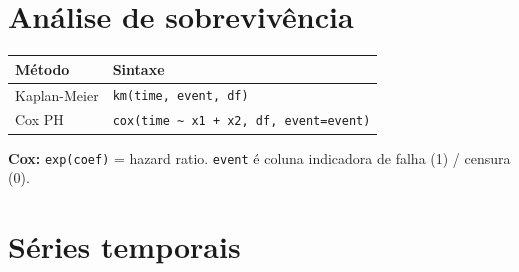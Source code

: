 \section{Análise de sobrevivência}

\begin{center}
\begin{tabular}{ll}
\toprule
\textbf{Método} & \textbf{Sintaxe} \\
\midrule
Kaplan-Meier & \texttt{km(time, event, df)} \\
Cox PH       & \texttt{cox(time \textasciitilde{} x1 + x2, df, event=event)} \\
\bottomrule
\end{tabular}
\end{center}

{\footnotesize \textbf{Cox:} \texttt{exp(coef)} = hazard ratio.
\texttt{event} é coluna indicadora de falha (1) / censura (0).}

\section{Séries temporais}

